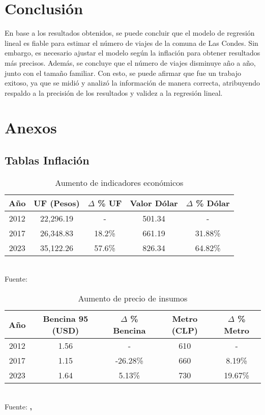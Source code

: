 \documentclass[12pt]{article} %
\begin{document}
\section{Conclusión}

En base a los resultados obtenidos, se puede concluir que el modelo de regresión lineal es fiable para estimar el número de viajes de la comuna de Las Condes. Sin embargo, es necesario ajustar el modelo según la inflación para obtener resultados más precisos. Además, se concluye que el número de viajes disminuye año a año, junto con el tamaño familiar. Con esto, se puede afirmar que fue un trabajo exitoso, ya que se midió y analizó la información de manera correcta, atribuyendo respaldo a la precisión de los resultados y validez a la regresión lineal.

\section{Anexos}

\subsection{Tablas Inflación}

\begin{table}[H]
    \centering
    \caption{Aumento de indicadores económicos}
    \vspace{0.2cm}
    \begin{tabular}{|c|c|c|c|c|}
        \hline
        Año & UF (Pesos) & $\Delta$ \% UF & Valor Dólar & $\Delta$ \% Dólar \\
        \hline
        2012 & 22,296.19 & - & 501.34 & - \\
        2017 & 26,348.83 & 18.2\% & 661.19 & 31.88\% \\
        2023 & 35,122.26 & 57.6\% & 826.34 & 64.82\% \\
        \hline
    \end{tabular}
    \vspace{0.2cm}
    \\Fuente: \textbf{\cite{sii}}
\end{table}

\begin{table}[H]
    \centering
    \caption{Aumento de precio de insumos}
    \vspace{0.2cm}
    \begin{tabular}{|c|c|c|c|c|}
        \hline
        Año & Bencina 95 (USD) & $\Delta$ \% Bencina & Metro (CLP) & $\Delta$ \% Metro \\
        \hline
        2012 & 1.56 & - & 610 & - \\
        2017 & 1.15 & -26.28\% & 660 & 8.19\% \\
        2023 & 1.64 & 5.13\% & 730 & 19.67\% \\
        \hline
    \end{tabular}
    \label{Insumos}
    \vspace{0.2cm}
    \\Fuente: \textbf{\cite{tradingeconomics}, \cite{bcentral}}
\end{table}
\end{document}
